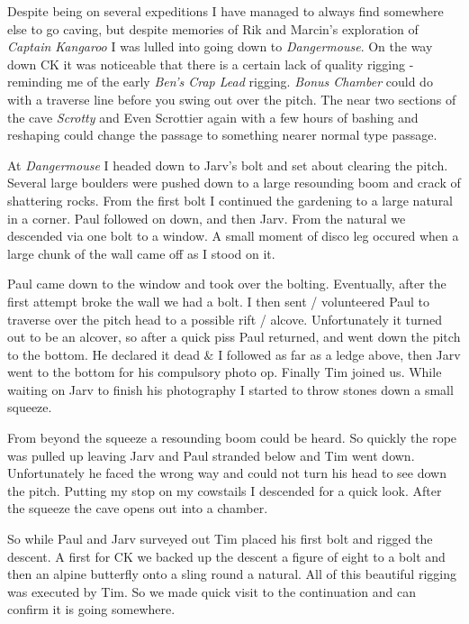 Despite being on several expeditions I have managed to always find
somewhere else to go caving, but despite memories of Rik and Marcin's
exploration of \emph{Captain Kangaroo} I was lulled into going down to
\emph{Dangermouse}. On the way down CK it was noticeable that there is a
certain lack of quality rigging - reminding me of the early \emph{Ben's
Crap Lead}
rigging. \emph{Bonus Chamber} could do with a traverse line before you
swing out over the pitch. The near two sections of the cave
\emph{Scrotty} and Even Scrottier again with a few hours of bashing and
reshaping could change the passage to something nearer normal type
passage.

At \emph{Dangermouse} I headed down to Jarv's bolt and set about
clearing the pitch. Several large boulders were pushed down to a large
resounding boom and crack of shattering rocks. From the first bolt I
continued the gardening to a large natural in a corner. Paul followed on
down, and then Jarv. From the natural we descended via one bolt to a
window. A small moment of disco leg occured when a large chunk of the
wall came off as I stood on it.

Paul came down to the window and took over the bolting. Eventually,
after the first attempt broke the wall we had a bolt. I then sent /
volunteered Paul to traverse over the pitch head to a possible rift /
alcove. Unfortunately it turned out to be an alcover, so after a quick
piss Paul returned, and went down the pitch to the bottom. He declared
it dead \& I followed as far as a ledge above, then Jarv went to the
bottom for his compulsory photo op. Finally Tim joined us. While waiting
on Jarv to finish his photography I started to throw stones down a small
squeeze.

From beyond the squeeze a resounding boom could be heard. So quickly the
rope was pulled up leaving Jarv and Paul stranded below and Tim went
down. Unfortunately he faced the wrong way and could not turn his head
to see down the pitch. Putting my stop on my cowstails I descended for a
quick look. After the squeeze the cave opens out into a chamber.

So while Paul and Jarv surveyed out Tim placed his first bolt and rigged
the descent. A first for CK we backed up the descent a figure of eight
to a bolt and then an alpine butterfly onto a sling round a natural. All
of this beautiful rigging was executed by Tim. So we made quick visit to
the continuation and can confirm it is going somewhere.

